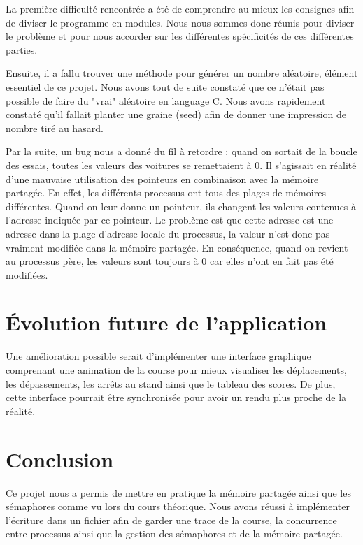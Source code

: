 \documentclass[11pt,a4paper]{article}
\begin{document}
La première difficulté rencontrée a été de comprendre au mieux les consignes afin de diviser le programme en modules. Nous nous sommes donc réunis pour diviser le problème et pour nous accorder sur les différentes spécificités de ces différentes parties.\par
Ensuite, il a fallu trouver une méthode pour générer un nombre aléatoire, élément essentiel de ce projet. Nous avons tout de suite constaté que ce n'était pas possible de faire du "vrai" aléatoire en language C. Nous avons rapidement constaté qu'il fallait planter une graine (seed) afin de donner une impression de nombre tiré au hasard.\par 
Par la suite, un bug nous a donné du fil à retordre :  quand on sortait de la boucle des essais, toutes les valeurs des voitures se remettaient à 0. Il s'agissait en réalité d'une mauvaise utilisation des pointeurs en combinaison avec la mémoire partagée. En effet, les différents processus ont tous des plages de mémoires différentes. Quand on leur donne un pointeur, ils changent les valeurs contenues à l'adresse indiquée par ce pointeur. Le problème est que cette adresse est une adresse dans la plage d'adresse locale du processus, la valeur n'est donc pas vraiment modifiée dans la mémoire partagée. En conséquence, quand on revient au processus père, les valeurs sont toujours à 0 car elles n'ont en fait pas été modifiées.

\section{Évolution future de l'application}

Une amélioration possible serait d'implémenter une interface graphique comprenant une animation de la course pour mieux visualiser les déplacements, les dépassements, les arrêts au stand ainsi que le tableau des scores. De plus, cette interface pourrait être synchronisée pour avoir un rendu plus proche de la réalité.

\section{Conclusion}
Ce projet nous a permis de mettre en pratique la mémoire partagée ainsi que les sémaphores comme vu lors du cours théorique. Nous avons réussi à implémenter l'écriture dans un fichier afin de garder une trace de la course, la concurrence entre processus ainsi que la gestion des sémaphores et de la mémoire partagée.

\newpage
\appendix
\end{document}
